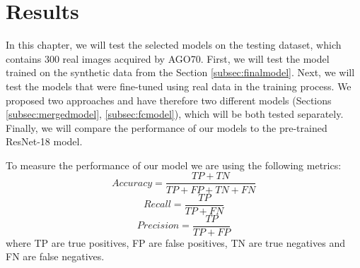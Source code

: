 \chapter{Results} \label{chap:results}

In this chapter, we will test the selected models on the testing dataset, which contains 300 real images acquired by AGO70. First, we will test the model trained on the synthetic data from the Section \ref{subsec:finalmodel}. Next, we will test the models that were fine-tuned using real data in the training process. We proposed two approaches and have therefore two different models (Sections \ref{subsec:mergedmodel}, \ref{subsec:fcmodel}), which will be both tested separately. Finally, we will compare the performance of our models to the pre-trained ResNet-18 model. 

To measure the performance of our model we are using the following metrics: 
\begin{equation}
    Accuracy = \frac{TP + TN}{TP + FP + TN + FN}
\end{equation} 
\begin{equation}
    Recall = \frac{TP}{TP + FN}
\end{equation}
\begin{equation}
    Precision = \frac{TP}{TP + FP}
\end{equation}
where TP are true positives, FP are false positives, TN are true negatives and FN are false negatives. 





